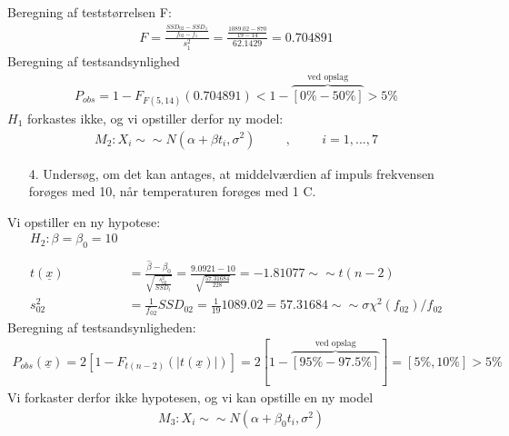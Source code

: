 \documentclass[paper=a4, fontsize=11pt]{scrartcl} %
\numberwithin{equation}{section} %
\numberwithin{figure}{section} %
\numberwithin{table}{section} %
\begin{document}
	Beregning af teststørrelsen F:
	\begin{align*}
	F=\frac{\frac{SSD_{02}-SSD_1}{f_{02}-f_1}}{s^2_1}=\frac{\frac{1089.02-870}{19-14}}{62.1429}=0.704891
	\end{align*}
	Beregning af testsandsynlighed
	\begin{align*}
	P_{obs}=1-F_{F(5,14)}(0.704891)<1-\overbrace{\left[ 0\%-50\% \right] }^\text{ved opslag}>5\%
	\end{align*}
	$H_1$ forkastes ikke, og vi opstiller derfor ny model:
	\begin{align*}
	M_2:X_i\sim\sim N(\alpha+\beta t_i,\sigma^2)\hspace{1cm},\hspace{1cm}i=1, ... ,7
	\end{align*}
	
	\begin{enumerate}
		\item[4.]Undersøg, om det kan antages, at middelværdien af impuls frekvensen forøges med 10, når temperaturen forøges med 1 \degree C.
	\end{enumerate}
	Vi opstiller en ny hypotese:
	\begin{align*}
	H_2:\beta=\beta_0=10& \\ \\t(\underline{x})&=\frac{\hat{\beta}-\beta_0}{\sqrt{\frac{s^2_{02}}{SSD_t}}}=\frac{9.0921-10}{\sqrt{\frac{57.31684}{228}}}=-1.81077\sim\sim t(n-2) \\
	s^2_{02}&=\frac{1}{f_{02}}SSD_{02}=\frac{1}{19}1089.02=57.31684\sim\sim \sigma\chi^2(f_{02})/f_{02}
	\end{align*}
	Beregning af testsandsynligheden:
	\begin{align*}
	P_{obs}(\underline{x})=2\left[1-F_{t(n-2)}(|t(\underline{x})|)\right]=2\left[1-\overbrace{\left[ 95\%-97.5\% \right] }^\text{ved opslag}\right]=\left[5\%,10\%\right]>5\%
	\end{align*}
	Vi forkaster derfor ikke hypotesen, og vi kan opstille en ny model
	\begin{align*}
	& M_3:X_i\sim\sim N(\alpha+\beta_0t_i,\sigma^2)
	\end{align*}
	
\end{document}
